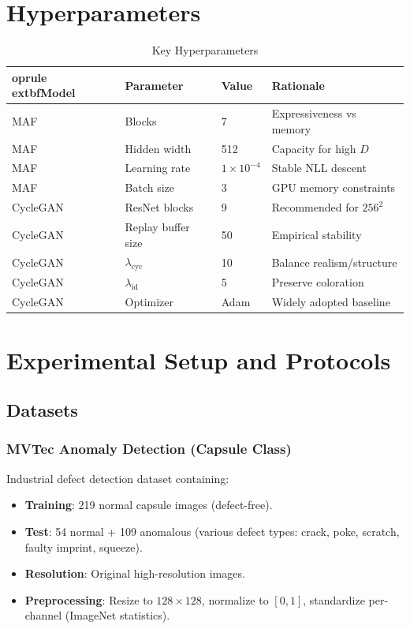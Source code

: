 \documentclass[11pt]{article}
\begin{document}
\section{Hyperparameters}
\begin{table}[h!]
 \centering
 \caption{Key Hyperparameters}
 \begin{tabular}{@{}l l l l@{}}
 	oprule
 	extbf{Model} & \textbf{Parameter} & \textbf{Value} & \textbf{Rationale} \\
 \midrule
 MAF & Blocks & 7 & Expressiveness vs memory \\
 MAF & Hidden width & 512 & Capacity for high $D$ \\
 MAF & Learning rate & $1\times10^{-4}$ & Stable NLL descent \\
 MAF & Batch size & 3 & GPU memory constraints \\
 CycleGAN & ResNet blocks & 9 & Recommended for $256^2$ \\
 CycleGAN & Replay buffer size & 50 & Empirical stability \\
 CycleGAN & $\lambda_{\text{cyc}}$ & 10 & Balance realism/structure \\
 CycleGAN & $\lambda_{\text{id}}$ & 5 & Preserve coloration \\
 CycleGAN & Optimizer & Adam & Widely adopted baseline \\
 \bottomrule
 \end{tabular}
\end{table}

\section{Experimental Setup and Protocols}
\subsection{Datasets}
\subsubsection{MVTec Anomaly Detection (Capsule Class)}
Industrial defect detection dataset containing:
\begin{itemize}
\item \textbf{Training}: 219 normal capsule images (defect-free).
\item \textbf{Test}: 54 normal + 109 anomalous (various defect types: crack, poke, scratch, faulty imprint, squeeze).
\item \textbf{Resolution}: Original high-resolution images.
\item \textbf{Preprocessing}: Resize to $128 \times 128$, normalize to $[0,1]$, standardize per-channel (ImageNet statistics).
\end{itemize}
\end{document}
